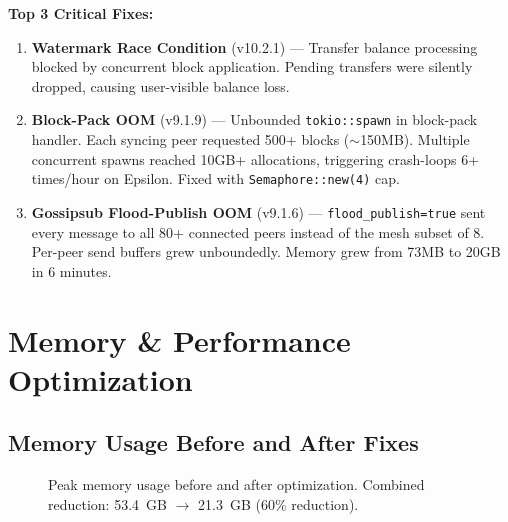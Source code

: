 \documentclass[11pt,a4paper]{article}
\begin{document}
\begin{criticalbox}
\textbf{Top 3 Critical Fixes:}
\begin{enumerate}[leftmargin=*]
    \item \textbf{Watermark Race Condition} (v10.2.1) --- Transfer balance processing blocked by concurrent block application. Pending transfers were silently dropped, causing user-visible balance loss.
    \item \textbf{Block-Pack OOM} (v9.1.9) --- Unbounded \texttt{tokio::spawn} in block-pack handler. Each syncing peer requested 500+ blocks ($\sim$150MB). Multiple concurrent spawns reached 10GB+ allocations, triggering crash-loops 6+ times/hour on Epsilon. Fixed with \texttt{Semaphore::new(4)} cap.
    \item \textbf{Gossipsub Flood-Publish OOM} (v9.1.6) --- \texttt{flood\_publish=true} sent every message to all 80+ connected peers instead of the mesh subset of 8. Per-peer send buffers grew unboundedly. Memory grew from 73MB to 20GB in 6 minutes.
\end{enumerate}
\end{criticalbox}

\section{Memory \& Performance Optimization}

\subsection{Memory Usage Before and After Fixes}

\begin{figure}[H]
\centering
{}
\caption{Peak memory usage before and after optimization. Combined reduction: 53.4~GB $\rightarrow$ 21.3~GB ($60\%$ reduction).}
\end{figure}
\end{document}
